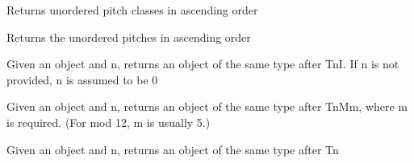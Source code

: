 \documentclass[letterpaper,10pt,english]{sphinxmanual}
\begin{document}
\begin{fulllineitems}
\begin{fulllineitems}
\end{fulllineitems}


\begin{fulllineitems}
\label{_templates/core:core.SetRowBase.uo_pcs}
Returns unordered pitch classes in ascending order

\end{fulllineitems}


\begin{fulllineitems}
\label{_templates/core:core.SetRowBase.uo_pitches}
Returns the unordered pitches in ascending order

\end{fulllineitems}


\end{fulllineitems}


\begin{fulllineitems}
\label{_templates/core:core.invert}
Given an object and n, returns an object of the same type after TnI.
If n is not provided, n is assumed to be 0

\end{fulllineitems}


\begin{fulllineitems}
\label{_templates/core:core.multiply}
Given an object and n, returns an object of the same type after TnMm,
where m is required. (For mod 12, m is usually 5.)

\end{fulllineitems}


\begin{fulllineitems}
\label{_templates/core:core.transpose}
Given an object and n, returns an object of the same type after Tn

\end{fulllineitems}
\end{document}

